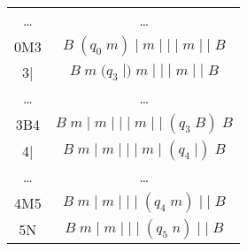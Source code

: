 \documentclass[a4paper, 12pt]{article}  %
\theoremstyle{definition}
\begin{document}
\begin{multicols}{2}
\begin{tabular}{ | c | c | }
			\dots & \dots \\
			0M3 & $ B \; (q_0 \; m) \;  | \;  m \; | \; | \; | \; m \; | \; | \;  B$ \\
			3| & $ B \;  m \; (q_3 \;  |) \;  m \; | \; | \; | \; m \; | \; | \;  B$ \\
			\dots & \dots \\
			3B4 & $ B \;  m \;  | \;  m \; | \; | \; | \; m \; | \; | \;  (q_3 \; B ) \; B$ \\
			4| & $ B \;  m \;  | \;  m \; | \; | \; | \; m \; | \; (q_4 \; |) \; B $ \\
			\dots & \dots \\
			4M5 & $ B \;  m \;  | \;  m \; | \; | \; | \; (q_4 \; m) \; | \;  | \; B $ \\
			5N & $ B \;  m \;  | \;  m \; | \; | \; | \; (q_5 \; n) \; | \;  | \; B $ \\
			\hline
		\end{tabular}
		

\end{multicols}
\end{document}
